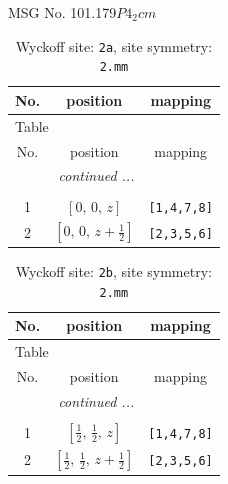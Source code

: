 \documentclass[fleqn,8pt]{jsarticle}
\begin{document}
\setcounter{MaxMatrixCols}{32}

\renewcommand{\tablename}{Table~}
\renewcommand{\figurename}{Figure~}
\begin{center}
\LARGE
MSG No. 101.179\quad$P4_{2}cm$
\end{center}
\renewcommand{\arraystretch}{1.2}
\begin{longtable}{ccc}
\caption{Wyckoff site: {\tt 2a}, site symmetry: {\tt 2.mm}}
 \\
 \hline \hline
No. & position & mapping \\ \hline \endfirsthead

\multicolumn{2}{l}{\tablename\ \thetable{}} \\
 \hline \hline
No. & position & mapping \\ \hline \endhead

 \hline \hline
\multicolumn{2}{r}{\footnotesize\it continued ...} \\ \endfoot

 \hline \hline
\multicolumn{2}{r}{} \\ \endlastfoot

1 & $\left[ 0,\, 0,\, z \right]$ & {\tt [1,4,7,8]} \\ \hline
2 & $\left[ 0,\, 0,\, z + \frac{1}{2} \right]$ & {\tt [2,3,5,6]} \\
\end{longtable}
\renewcommand{\arraystretch}{1.2}
\begin{longtable}{ccc}
\caption{Wyckoff site: {\tt 2b}, site symmetry: {\tt 2.mm}}
 \\
 \hline \hline
No. & position & mapping \\ \hline \endfirsthead

\multicolumn{2}{l}{\tablename\ \thetable{}} \\
 \hline \hline
No. & position & mapping \\ \hline \endhead

 \hline \hline
\multicolumn{2}{r}{\footnotesize\it continued ...} \\ \endfoot

 \hline \hline
\multicolumn{2}{r}{} \\ \endlastfoot

1 & $\left[ \frac{1}{2},\, \frac{1}{2},\, z \right]$ & {\tt [1,4,7,8]} \\ \hline
2 & $\left[ \frac{1}{2},\, \frac{1}{2},\, z + \frac{1}{2} \right]$ & {\tt [2,3,5,6]} \\
\end{longtable}
\end{document}
